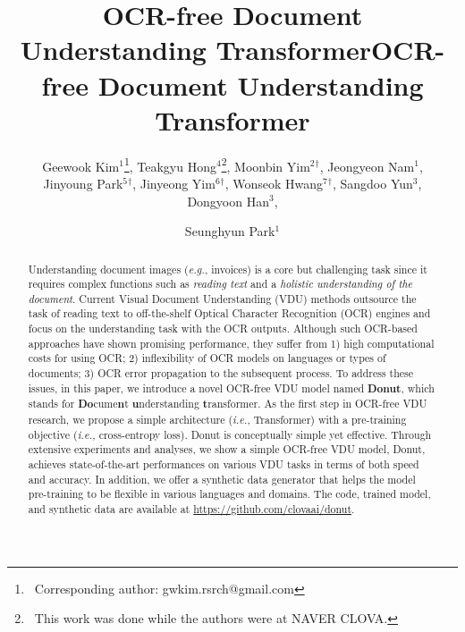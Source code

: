 \documentclass[runningheads]{llncs}
\newcommand\ours{{{\mbox{Donut}}}\xspace}
\newcommand\oursb{{\textbf{\mbox{Donut}}}\xspace}
\begin{document}
\pagestyle{headings}
\mainmatter

\title{OCR-free Document Understanding Transformer}



\title{OCR-free Document Understanding Transformer}
\author{Geewook Kim$^{1}$\thanks{\ Corresponding author: gwkim.rsrch@gmail.com}, Teakgyu Hong$^{4}$\thanks{\ This work was done while the authors were at NAVER CLOVA.}, Moonbin Yim$^{2}$$^{\dag}$, Jeongyeon Nam$^{1}$, \\ Jinyoung Park$^{5}$$^{\dag}$, Jinyeong Yim$^{6}$$^{\dag}$, Wonseok Hwang$^{7}$$^{\dag}$, Sangdoo Yun$^{3}$, \\ Dongyoon Han$^{3}$, \and Seunghyun Park$^{1}$}
\maketitle

\begin{abstract}
Understanding document images (\textit{e.g.}, invoices) is a core but challenging task since it requires complex functions such as \textit{reading text} and a \textit{holistic understanding of the document}.
Current Visual Document Understanding (VDU) methods outsource the task of reading text to off-the-shelf Optical Character Recognition (OCR) engines and focus on the understanding task with the OCR outputs.
Although such OCR-based approaches have shown promising performance, they suffer from 1) high computational costs for using OCR; 2) inflexibility of OCR models on languages or types of documents; 3) OCR error propagation to the subsequent process. 
To address these issues, in this paper, we introduce a novel OCR-free VDU model named \oursb, which stands for \textbf{Do}cume\textbf{n}t \textbf{u}nderstanding \textbf{t}ransformer.
As the first step in OCR-free VDU research, we propose a simple architecture (\textit{i.e.}, Transformer) with a pre-training objective (\textit{i.e.,} cross-entropy loss).
Donut is conceptually simple yet effective. Through extensive experiments and analyses, we show a simple OCR-free VDU model, \ours, achieves state-of-the-art performances on various VDU tasks in terms of both speed and accuracy.
In addition, we offer a synthetic data generator that helps the model pre-training to be flexible in various languages and domains.
The code, trained model, and synthetic data are available at \url{https://github.com/clovaai/donut}.
\end{abstract}
\end{document}

